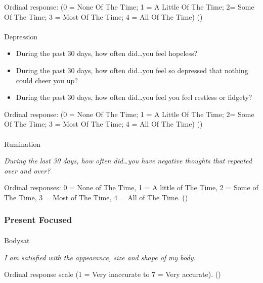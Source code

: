 \documentclass[
  single column]{article}
\makeatletter
\let\oldparagraph\paragraph
\renewcommand{\paragraph}{
    \@ifstar
      \xxxParagraphStar
      \xxxParagraphNoStar
  }
\newcommand{\xxxParagraphStar}[1]{\oldparagraph*{#1}\mbox{}}
\newcommand{\xxxParagraphNoStar}[1]{\oldparagraph{#1}\mbox{}}
\providecommand{\tightlist}{%
  \setlength{\itemsep}{0pt}\setlength{\parskip}{0pt}}\usepackage{longtable,booktabs,array}
\makeatother
\begin{document}
Ordinal response: (0 = None Of The Time; 1 = A Little Of The Time; 2=
Some Of The Time; 3 = Most Of The Time; 4 = All Of The Time)
()

\paragraph{Depression}\label{depression-1}

\begin{itemize}
\tightlist
\item
  During the past 30 days, how often did\ldots you feel hopeless?
\item
  During the past 30 days, how often did\ldots you feel so depressed
  that nothing could cheer you up?
\item
  During the past 30 days, how often did\ldots you feel you feel
  restless or fidgety?
\end{itemize}

Ordinal response: (0 = None Of The Time; 1 = A Little Of The Time; 2=
Some Of The Time; 3 = Most Of The Time; 4 = All Of The Time)
()

\paragraph{Rumination}\label{rumination}

\emph{During the last 30 days, how often did\ldots you have negative
thoughts that repeated over and over?}

Ordinal responses: 0 = None of The Time, 1 = A little of The Time, 2 =
Some of The Time, 3 = Most of The Time, 4 = All of The Time.
()

\subsubsection{Present Focused}\label{present-focused}

\paragraph{Bodysat}\label{bodysat}

\emph{I am satisfied with the appearance, size and shape of my body.}

Ordinal response scale (1 = Very inaccurate to 7 = Very accurate).
()
\end{document}
